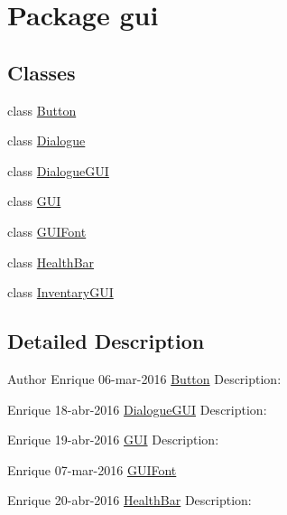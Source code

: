 \hypertarget{namespacegui}{}\section{Package gui}
\label{namespacegui}
\subsection*{Classes}
\begin{DoxyCompactItemize}
\item 
class \mbox{\hyperlink{classgui_1_1_button}{Button}}
\item 
class \mbox{\hyperlink{classgui_1_1_dialogue}{Dialogue}}
\item 
class \mbox{\hyperlink{classgui_1_1_dialogue_g_u_i}{Dialogue\+G\+UI}}
\item 
class \mbox{\hyperlink{classgui_1_1_g_u_i}{G\+UI}}
\item 
class \mbox{\hyperlink{classgui_1_1_g_u_i_font}{G\+U\+I\+Font}}
\item 
class \mbox{\hyperlink{classgui_1_1_health_bar}{Health\+Bar}}
\item 
class \mbox{\hyperlink{classgui_1_1_inventary_g_u_i}{Inventary\+G\+UI}}
\end{DoxyCompactItemize}


\subsection{Detailed Description}
\begin{DoxyAuthor}{Author}
Enrique  06-\/mar-\/2016  \mbox{\hyperlink{classgui_1_1_button}{Button}} Description\+:

Enrique  18-\/abr-\/2016  \mbox{\hyperlink{classgui_1_1_dialogue_g_u_i}{Dialogue\+G\+UI}} Description\+:

Enrique  19-\/abr-\/2016  \mbox{\hyperlink{classgui_1_1_g_u_i}{G\+UI}} Description\+:

Enrique  07-\/mar-\/2016  \mbox{\hyperlink{classgui_1_1_g_u_i_font}{G\+U\+I\+Font}}

Enrique  20-\/abr-\/2016  \mbox{\hyperlink{classgui_1_1_health_bar}{Health\+Bar}} Description\+: 
\end{DoxyAuthor}
